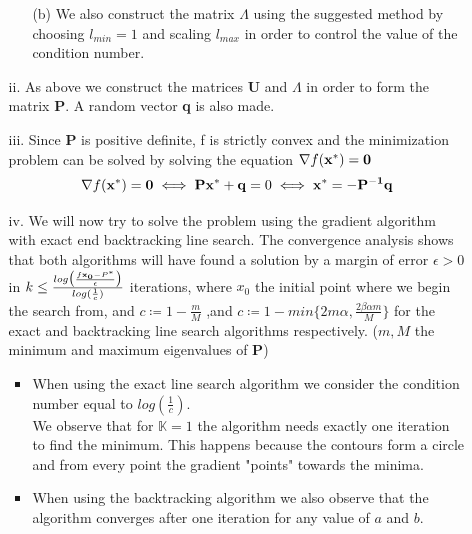 \documentclass[12pt]{article}
\begin{document}
\begin{enumerate}
\begin{enumerate}
\begin{enumerate}
				\item[(b)]
				We also construct the matrix $\Lambda$ using the suggested method by choosing $l_{min}=1$ and scaling $l_{max}$ in order to control the value of the condition number.
				
			\end{enumerate}
		
			\item[ii.]
			As above we construct the matrices {\bf U} and {\bf $\Lambda$} in order to form the matrix {\bf P}. A random vector {\bf q } is also made. 
			
			
			\item[iii.] Since {\bf P} is positive definite, f is strictly convex and the minimization problem can be solved by solving the equation $\nabla f({\bf x^*})={\bf 0}$
			\begin{equation}
				\nabla f({\bf x^*})={\bf 0} \iff {\bf P}{\bf x^*}+{\bf q} = 0 \iff {\bf x^*}={\bf -P^{-1}{\bf q}}
			\end{equation}
			
			
			\item[iv.]
			We will now try to solve the problem using the gradient algorithm with exact end backtracking line search. The convergence analysis shows that both algorithms will have found a solution by a margin of error $\epsilon>0$ in $k\leq\frac{log\big(\frac{f{{\bf x_0}-P^*}}{\epsilon}\big)}{log(\frac{1}{c})}$ iterations, where $x_0$ the initial point where we begin the search from, and $c\coloneqq1-\frac{m}{M}$ ,and $c\coloneqq 1- min\{2m\alpha,\frac{2\beta\alpha m}{M}\}$ for the exact and backtracking line search algorithms respectively. ($m,M$ the minimum and maximum eigenvalues of {\bf P})
			\begin{itemize}
				\item 
				When using the exact line search algorithm we consider the condition number equal to $log(\frac{1}{c})$.\\
				We observe that for $\mathbb{K}=1$ the algorithm needs exactly one iteration to find the minimum. This happens because the contours form a circle and from 
				every point the gradient "points" towards the minima.
				\item 
				When using the backtracking algorithm we also observe that the algorithm converges after one iteration for any value of $a$ and $b$.
			\end{itemize}
		

\end{enumerate}
\end{enumerate}
\end{document}
